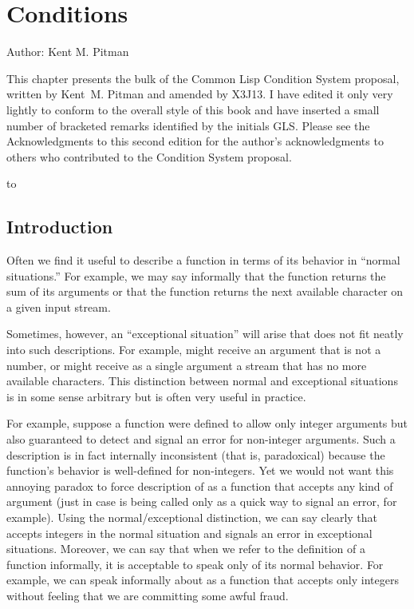 \clearpage\def\pagestatus{FINAL PROOF}

\def\SU#1{${}_{#1}$}

\ifx \rulang\Undef

\chapter{Conditions}
\label{CONDITION}


Author: Kent M. Pitman

This chapter presents the bulk of the Common Lisp
Condition System proposal, written by Kent~M. Pitman
and amended by X3J13.  I have edited it only very lightly
to conform to the overall style of this book and have inserted a small
number of bracketed remarks identified by the initials GLS.
Please see the Acknowledgments to this second edition for the author's
acknowledgments to others who contributed to the Condition System proposal.

\noindent\hbox to \textwidth{\hss---Guy L. Steele Jr.}

\section{Introduction}

Often we find it useful to describe a function in terms of its behavior in
``normal situations.'' For example, we may say informally that the function
\cdf{+} returns the sum of its arguments or that the function
 returns the next available character on a given input
stream.

Sometimes, however, an ``exceptional situation'' will arise that does not fit
neatly into such descriptions. For example, \cdf{+} might receive an argument
that is not a number, or  might receive as a single argument
a stream that has no more available characters.  This distinction between normal
and exceptional situations is in some sense arbitrary but is often very
useful in practice.

For example, suppose a function  were defined to allow only
integer arguments but also guaranteed to
detect and signal an error for non-integer arguments.
Such a description is in fact internally inconsistent (that is,
paradoxical) because the function's behavior is well-defined for non-integers.
Yet we would not want this annoying paradox to force description of 
as a function that accepts any kind of argument (just in case 
is being called only as a quick way to signal an error, for example).
Using the normal/exceptional distinction, we can say clearly that  accepts integers
in the normal situation and signals an error in exceptional situations.
Moreover, we can say that when we refer to the definition of a
function informally, it is acceptable to speak only of its normal behavior.
For example, we can speak informally about  as a function that accepts only
integers without feeling that we are committing some awful fraud.

